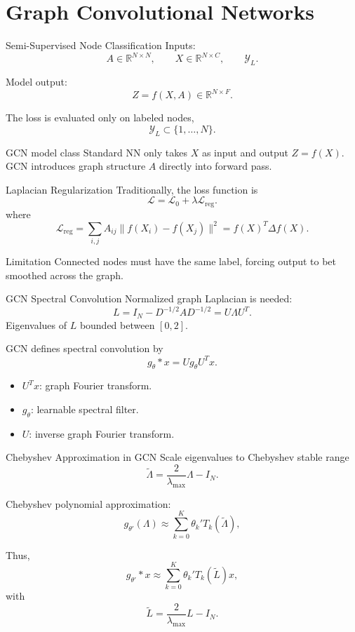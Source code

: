 \documentclass[aspectratio=1610,xcolor=dvipsnames,t]{beamer}
\newcommand{\R}{\mathbb{R}}
\newcommand{\Y}{\mathcal{Y}}
\begin{document}
\section[GCN]{Graph Convolutional Networks}

\begin{frame}{Semi-Supervised Node Classification}
Inputs:
\[
A\in\R^{N\times N},
\qquad
X\in\R^{N\times C},
\qquad
\Y_L.
\]

Model output:
\[
Z=f(X,A)\in\R^{N\times F}.
\]

The loss is evaluated only on labeled nodes,
\[
\Y_L\subset\{1,\ldots,N\}.
\]

\begin{block}{GCN model class}
Standard NN only takes $X$ as input and output $Z=f(X)$. GCN introduces graph structure $A$ directly into forward pass.
\end{block}
\end{frame}

\begin{frame}{Laplacian Regularization}
Traditionally, the loss function is
\[
\mathcal{L}=\mathcal{L}_0+\lambda\mathcal{L}_{\mathrm{reg}}.
\tag{GCN Eq. 1}
\]
where
\[
\mathcal{L}_{\mathrm{reg}}
=
\sum_{i,j}A_{ij}\|f(X_i)-f(X_j)\|^2
=f(X)^T\Delta f(X).
\]

\begin{alertblock}{Limitation}
Connected nodes must have the same label, forcing output to bet smoothed across the graph.
\end{alertblock}
\end{frame}

\begin{frame}{GCN Spectral Convolution}
Normalized graph Laplacian is needed:
\[
L=I_N-D^{-1/2}AD^{-1/2}=U\Lambda U^T.
\]
Eigenvalues of $L$ bounded between $[0,2]$.

GCN defines spectral convolution by
\[
g_\theta*x=Ug_\theta U^Tx.
\tag{GCN Eq. 3}
\]

\begin{itemize}
  \item $U^Tx$: graph Fourier transform.
  \item $g_\theta$: learnable spectral filter.
  \item $U$: inverse graph Fourier transform.
\end{itemize}
\end{frame}

\begin{frame}{Chebyshev Approximation in GCN}
Scale eigenvalues to Chebyshev stable range
\[
\widetilde{\Lambda}=\frac{2}{\lambda_{\max}}\Lambda-I_N.
\]

Chebyshev polynomial approximation:
\[
g_{\theta'}(\Lambda)
\approx
\sum_{k=0}^{K}\theta_k'T_k(\widetilde{\Lambda}),
\tag{GCN Eq. 4}
\]

Thus,
\[
g_{\theta'}*x
\approx
\sum_{k=0}^{K}\theta_k'T_k(\widetilde L)x,
\tag{GCN Eq. 5}
\]
with
\[
\widetilde L=\frac{2}{\lambda_{\max}}L-I_N.
\]
\end{frame}
\end{document}
